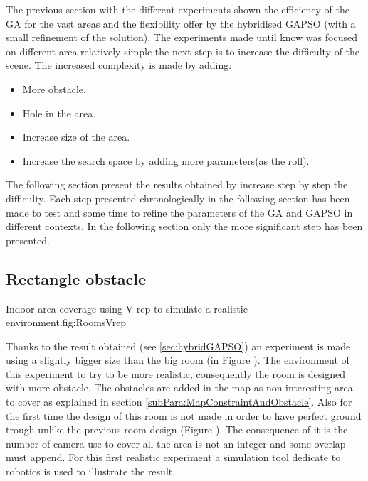 The previous section with the different experiments shown the efficiency of the GA for the vast areas and the flexibility offer by the hybridised GAPSO (with a small refinement of the solution). The experiments made until know was focused on different area relatively simple the next step is to increase the difficulty of the scene. The increased complexity is made by adding: 
\begin{itemize}
\item More obstacle.
\item Hole in the area.
\item Increase size of the area.
\item Increase the search space by adding more parameters(as the roll). 
\end{itemize} 
The following section present the results obtained by increase step by step the difficulty. Each step presented chronologically in the following section has been made to test and some time to refine the parameters of the GA and GAPSO in different contexts. In the following section only the more significant step has been presented.

	\subsection{Rectangle obstacle } \label{sec:expRectObstacle}
	\begin{mfigures}[!]{Indoor area coverage using V-rep to simulate a realistic environment.}{fig:RoomsVrep} \centering
{}
\hspace{1cm}
\hspace{1cm}

\tabsimuposeVrep
\end{mfigures}
	
	Thanks to the result obtained (see \ref{sec:hybridGAPSO}) an experiment is made using a slightly bigger size than the big room (in Figure ). The environment of this experiment to try to be more realistic, consequently the room is designed with more obstacle. 
	The obstacles are added in the map as non-interesting area to cover as explained in  section \ref{subPara:MapConstraintAndObstacle}. Also for the first time the design of this room  is  not made in order to have perfect ground trough unlike the previous room design (Figure ). The consequence of it is the number of camera use to cover all the area is not an integer and some overlap must append.
	For this first realistic experiment a simulation tool dedicate to robotics is used to illustrate the result. 
	     
